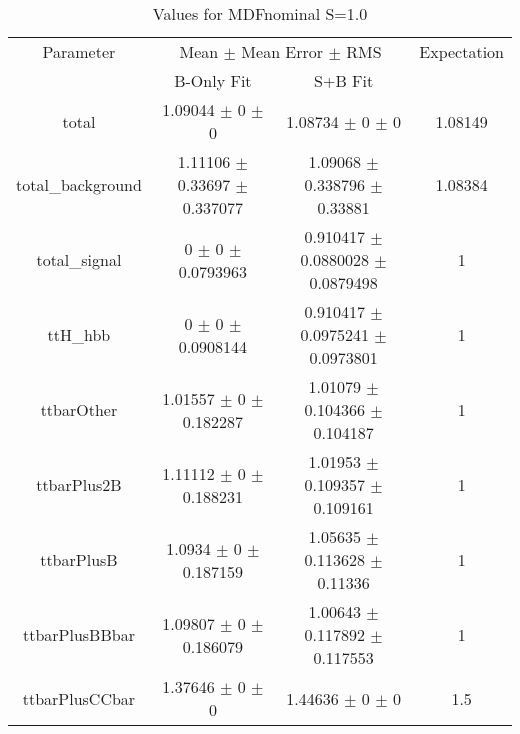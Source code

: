 \begin{table}
\centering
\caption{Values for MDFnominal S=1.0}
\begin{tabular}{cccc}
\toprule
Parameter & \multicolumn{2}{c}{Mean $\pm$ Mean Error $\pm$ RMS} & Expectation\\
 & B-Only Fit & S+B Fit & \\
\midrule
total & \num{1.09044} $\pm$ \num{0} $\pm$ \num{0} & \num{1.08734} $\pm$ \num{0} $\pm$ \num{0} & \num{1.08149}\\
total\_background & \num{1.11106} $\pm$ \num{0.33697} $\pm$ \num{0.337077} & \num{1.09068} $\pm$ \num{0.338796} $\pm$ \num{0.33881} & \num{1.08384}\\
total\_signal & \num{0} $\pm$ \num{0} $\pm$ \num{0.0793963} & \num{0.910417} $\pm$ \num{0.0880028} $\pm$ \num{0.0879498} & \num{1}\\
ttH\_hbb & \num{0} $\pm$ \num{0} $\pm$ \num{0.0908144} & \num{0.910417} $\pm$ \num{0.0975241} $\pm$ \num{0.0973801} & \num{1}\\
ttbarOther & \num{1.01557} $\pm$ \num{0} $\pm$ \num{0.182287} & \num{1.01079} $\pm$ \num{0.104366} $\pm$ \num{0.104187} & \num{1}\\
ttbarPlus2B & \num{1.11112} $\pm$ \num{0} $\pm$ \num{0.188231} & \num{1.01953} $\pm$ \num{0.109357} $\pm$ \num{0.109161} & \num{1}\\
ttbarPlusB & \num{1.0934} $\pm$ \num{0} $\pm$ \num{0.187159} & \num{1.05635} $\pm$ \num{0.113628} $\pm$ \num{0.11336} & \num{1}\\
ttbarPlusBBbar & \num{1.09807} $\pm$ \num{0} $\pm$ \num{0.186079} & \num{1.00643} $\pm$ \num{0.117892} $\pm$ \num{0.117553} & \num{1}\\
ttbarPlusCCbar & \num{1.37646} $\pm$ \num{0} $\pm$ \num{0} & \num{1.44636} $\pm$ \num{0} $\pm$ \num{0} & \num{1.5}\\
\bottomrule
\end{tabular}
\end{table}